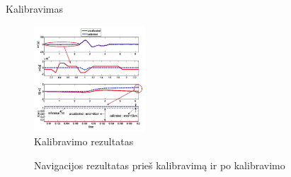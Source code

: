 \documentclass{beamer}
\begin{document}
    \begin{frame}[allowframebreaks]{Kalibravimas}
        
        \begin{figure}[H]
            \centering
            \includegraphics[height=150px]{img/calibration.png}
            \caption{Kalibravimo rezultatas \cite{yoo2011fuzzy}}
        \end{figure}

        \framebreak

        \begin{figure}[H]
            \centering
            \caption{Navigacijos rezultatas prieš kalibravimą ir po kalibravimo \cite{yoo2011fuzzy}}
        \end{figure}
    \end{frame}
\end{document}
